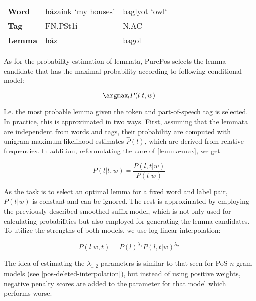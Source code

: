 \begin{table}[h]
\begin{tabular}{l l l}
  \textbf{Word} &  házaink ‘my houses’ &  baglyot ‘owl‘\\
  \textbf{Tag} &  FN.PSt1i &  N.AC\\
  \textbf{Lemma} &  ház &  bagol\\
\end{tabular}
\end{table}

As for the probability estimation of lemmata, PurePos selects the lemma candidate that has the maximal probability according to following conditional model:

\begin{equation}\label{lemma-max}
\argmax_l P(l|t,w)
\end{equation}

I.e. the most probable lemma given the token and part-of-speech tag is selected. In practice, this is approximated in two ways. First, assuming that the lemmata are independent from words and tags, their probability are computed with unigram maximum likelihood estimates $\hat{P}(l)$, which are derived from relative frequencies. In addition, reformulating the core of \eqref{lemma-max}, we get

\begin{equation}\label{lemma-guesser}
P(l|t,w) = \frac{P(l,t|w)}{P(t|w)}
\end{equation}

As the task is to select an optimal lemma for a fixed word and label pair, $P(t|w)$ is constant and can be ignored. The rest is approximated by employing the previously described smoothed suffix model, which  is not only used for calculating probabilities but also employed for generating the lemma candidates.  To utilize the strengths of both models, we use log-linear interpolation: 

\begin{equation}\label{lemma-interpolated}
P(l|w,t) = P(l)^{\lambda_1} P(l,t|w)^{\lambda_2}
\end{equation}

The idea of estimating the $\lambda_{1,2}$ parameters is similar to that seen for PoS $n$-gram models (see \ref{pos-deleted-interpolation}), but instead of using positive weights, negative penalty scores are added to the parameter for that model which performs worse.  

